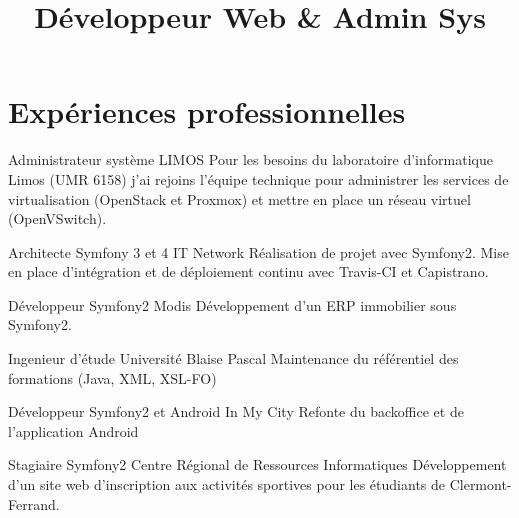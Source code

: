 \documentclass[11pt,a4paper]{moderncv}
\title{Développeur Web \& Admin Sys}                               %
\begin{document}
    \maketitle
    \section{Expériences professionnelles}
        {Administrateur système}
        {LIMOS}
        {}
        {}
        {
          \justify
          Pour les besoins du laboratoire d'informatique Limos (UMR 6158) j'ai rejoins l'équipe technique \newline{}
          pour administrer les services de virtualisation (OpenStack et Proxmox) et mettre en place un \newline{}
          réseau virtuel (OpenVSwitch).
        }

        {Architecte Symfony 3 et 4}
        {IT Network}
        {}
        {}
        {
          \justify
          Réalisation de projet avec Symfony2. Mise en place d'intégration et de déploiement continu avec\newline{}
          Travis-CI et Capistrano.
        }

        {
          Développeur Symfony2
        }
        {Modis}
        {}
        {}
        {Développement d'un ERP immobilier sous Symfony2.}

        {Ingenieur d'étude}
        {Université Blaise Pascal}
        {}
        {}
        {Maintenance du référentiel des formations (Java, XML, XSL-FO)}

        {Développeur Symfony2 et Android}
        {In My City}
        {}
        {}
        {Refonte du backoffice et de l'application Android}

        {Stagiaire Symfony2}
        {Centre Régional de Ressources Informatiques}
        {}
        {}
        {
          Développement d'un site web d'inscription aux activités sportives pour les étudiants \newline{}
          de Clermont-Ferrand. 
        }
\end{document}
